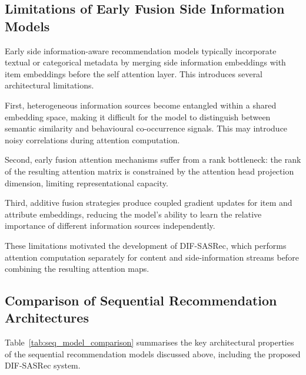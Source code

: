 \subsection{ Limitations of Early Fusion Side Information Models
}

Early side information-aware recommendation models typically incorporate textual or categorical metadata by merging side information embeddings with item embeddings before the self attention layer. This introduces several architectural limitations.

First, heterogeneous information sources become entangled within a shared embedding space, making it difficult for the model to distinguish between semantic similarity and behavioural co-occurrence signals. This may introduce noisy correlations during attention computation.

Second, early fusion attention mechanisms suffer from a rank bottleneck: the rank of the resulting attention matrix is constrained by the attention head projection dimension, limiting representational capacity.

Third, additive fusion strategies produce coupled gradient updates for item and attribute embeddings, reducing the model’s ability to learn the relative importance of different information sources independently.

These limitations motivated the development of DIF-SASRec, which performs attention computation separately for content and side-information streams before combining the resulting attention maps.

\subsection{Comparison of Sequential Recommendation Architectures}
\label{sec:seq_model_comparison}

Table~\ref{tab:seq_model_comparison} summarises the key architectural properties of the sequential recommendation models discussed above, including the proposed DIF-SASRec system.

